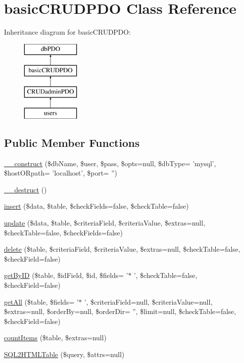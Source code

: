 \hypertarget{classbasic_c_r_u_d_p_d_o}{\section{basic\-C\-R\-U\-D\-P\-D\-O Class Reference}
\label{classbasic_c_r_u_d_p_d_o}
}
Inheritance diagram for basic\-C\-R\-U\-D\-P\-D\-O\-:\begin{figure}[H]
\begin{center}
\leavevmode
\includegraphics[height=4.000000cm]{classbasic_c_r_u_d_p_d_o}
\end{center}
\end{figure}
\subsection*{Public Member Functions}
\begin{DoxyCompactItemize}
\item 
\hyperlink{classbasic_c_r_u_d_p_d_o_a7f93adf2a111686240ea50fdd8bd8ebf}{\-\_\-\-\_\-construct} (\$db\-Name, \$user, \$pass, \$opts=null, \$db\-Type= 'mysql', \$host\-O\-Rpath= 'localhost', \$port= '')
\item 
\hyperlink{classbasic_c_r_u_d_p_d_o_a421831a265621325e1fdd19aace0c758}{\-\_\-\-\_\-destruct} ()
\item 
\hyperlink{classbasic_c_r_u_d_p_d_o_adabf861bb374d51cf007f9b6888303cf}{insert} (\$data, \$table, \$check\-Fields=false, \$check\-Table=false)
\item 
\hyperlink{classbasic_c_r_u_d_p_d_o_ab6c22e1f41766b0678cdd7c503baaa1f}{update} (\$data, \$table, \$criteria\-Field, \$criteria\-Value, \$extras=null, \$check\-Table=false, \$check\-Fields=false)
\item 
\hyperlink{classbasic_c_r_u_d_p_d_o_a0b1faa3905d79b263299154d0e51f408}{delete} (\$table, \$criteria\-Field, \$criteria\-Value, \$extras=null, \$check\-Table=false, \$check\-Field=false)
\item 
\hyperlink{classbasic_c_r_u_d_p_d_o_a7eb0e7204cac6c32a450c90a90d611b1}{get\-By\-I\-D} (\$table, \$id\-Field, \$id, \$fields= '$\ast$ ', \$check\-Table=false, \$check\-Field=false)
\item 
\hyperlink{classbasic_c_r_u_d_p_d_o_a2803d8e3b0a8dcc8f1efc580d4b254fe}{get\-All} (\$table, \$fields= '$\ast$ ', \$criteria\-Field=null, \$criteria\-Value=null, \$extras=null, \$order\-By=null, \$order\-Dir= '', \$limit=null, \$check\-Table=false, \$check\-Field=false)
\item 
\hyperlink{classbasic_c_r_u_d_p_d_o_ab308739e3ca8d66719416002fd06fe5d}{count\-Items} (\$table, \$extras=null)
\item 
\hyperlink{classbasic_c_r_u_d_p_d_o_a6c556dc28409d01baef0f524ecb66819}{S\-Q\-L2\-H\-T\-M\-L\-Table} (\$query, \$attrs=null)
\end{DoxyCompactItemize}
